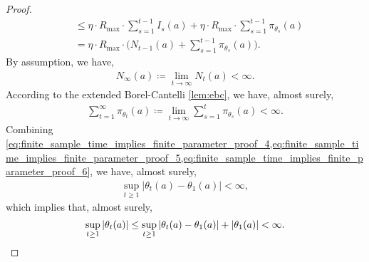 \begin{proof}
\begin{align}
    &\le \eta \cdot R_{\max} \cdot \sum_{s=1}^{t-1}{ I_s(a) } + \eta \cdot R_{\max} \cdot \sum_{s=1}^{t-1}{ \pi_{\theta_s}(a) } \\
    &= \eta \cdot R_{\max} \cdot \Big( N_{t-1}(a) + \sum_{s=1}^{t-1}{ \pi_{\theta_s}(a) } \Big).
\end{align}
By assumption, we have,
\begin{align}
\label{eq:finite_sample_time_implies_finite_parameter_proof_5}
    N_\infty(a) \coloneqq \lim_{t \to \infty}{N_t(a)} < \infty.
\end{align}
According to the extended Borel-Cantelli \cref{lem:ebc}, we have, almost surely,
\begin{align}
\label{eq:finite_sample_time_implies_finite_parameter_proof_6}
    \sum_{t=1}^{\infty}{\pi_{\theta_t}(a)} \coloneqq \lim_{t \to \infty}{ \sum_{s=1}^{t}{ \pi_{\theta_s}(a) } } < \infty.
\end{align}
Combining \cref{eq:finite_sample_time_implies_finite_parameter_proof_4,eq:finite_sample_time_implies_finite_parameter_proof_5,eq:finite_sample_time_implies_finite_parameter_proof_6}, we have, almost surely,
\begin{align}
\label{eq:finite_sample_time_implies_finite_parameter_proof_7}
    \sup_{t \ge 1}{ \left| \theta_t(a) - \theta_1(a) \right| } < \infty,
\end{align}
which implies that, almost surely,
\begin{equation*}
    \sup_{t \ge 1}{ \left| \theta_t(a) \right| } \le \sup_{t \ge 1}{ \left| \theta_t(a) - \theta_1(a) \right| + \left| \theta_1(a) \right| } < \infty. \qedhere
\end{equation*}
\end{proof}

